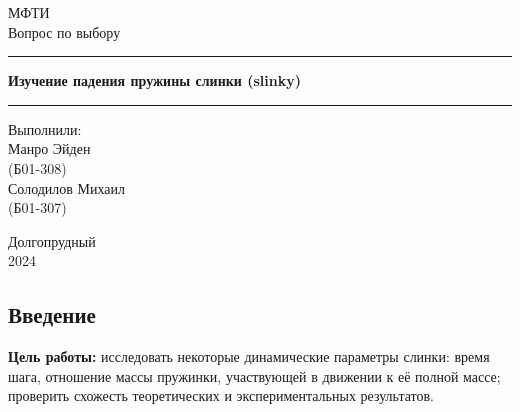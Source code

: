 \documentclass[a4paper, 12pt]{article}
\begin{document}
\begin{titlepage}
    
    \begin{center}

        \vspace*{5cm}
        \Huge МФТИ
        \vspace*{2cm}\\
        \LARGE Вопрос по выбору
        \\\vspace*{0.25cm}
        
        \noindent\rule{\textwidth}{1pt}
        \vspace*{-0.25cm}
        
        \huge \textbf{Изучение падения пружины слинки (slinky)}
        \noindent\rule{\textwidth}{1pt}


       \vfill

        \begin{flushright}
            \begin{minipage}{.4\textwidth}
            \Large Выполнили: \\ Манро Эйден      \\ (Б01-308) 
                              \\ Солодилов Михаил \\ (Б01-307)
            \end{minipage}
        \end{flushright}
        
        \vfill

        \normalsize Долгопрудный \\2024
        
    \end{center}

\end{titlepage}
\restoregeometry

\begin{center}
    \section*{Введение}
\end{center}


\noindent \textbf{Цель работы:} исследовать некоторые динамические параметры слинки: время шага, отношение массы пружинки, участвующей в движении к её полной массе; проверить схожесть теоретических и экспериментальных результатов.  
\end{document}

